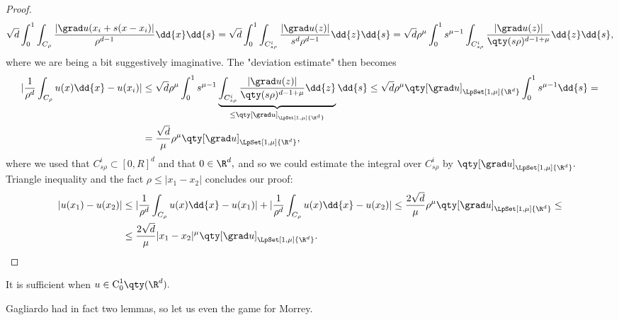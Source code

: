 \begin{proof}
	\[
		\sqrt{d}\int_0^1\int_{C_{\rho}}\frac{|\grad u(x_i + s(x - x_i)|}{\rho^{d-1}}\dd{x} \dd{s} =\sqrt{d} \int_0^1 \int_{C^i_{s \rho}}\frac{|\grad u(z)|}{s^d \rho^{d-1}}\dd{z}\dd{s} =\sqrt{d} \rho^{\mu} \int_0^1 s^{\mu-1} \int_{C_{s \rho}^i}\frac{|\grad u(z)|}{\qty(s \rho)^{d-1 + \mu}}\dd{z}\dd{s},
	\]
	where we are being a bit suggestively imaginative. The "deviation estimate" then becomes
	\begin{align*}
		|\frac{1}{\rho^d}\int_{C_{\rho}}u(x)\dd{x} - u(x_i)| &\leq \sqrt{d}\rho^{\mu}\int_0^1 s^{\mu-1} \underbrace{\int_{C^i_{s \rho}}\frac{|\grad u(z)|}{\qty(s \rho)^{d-1+\mu}}\dd{z}}_{\leq \qty[\grad u]_{\LpSet[1,\mu]{\R^{d}}}}\dd{s} \leq \sqrt{d} \rho^{\mu} \qty[\grad u]_{\LpSet[1,\mu]{\R^{d}}}\int_0^1 s^{\mu-1}\dd{s}= \\
		&= \frac{\sqrt{d}}{\mu}\rho^{\mu}\qty[\grad u]_{\LpSet[1,\mu]{\R^{d}}},
	\end{align*}
where we used that $C_{s \rho}^i \subset [0,R]^{d}$ and that $0 \in \R^{d},$ and so we could estimate the integral over $C_{s \rho}^i$ by $\qty[\grad u]_{\LpSet[1,\mu]{\R^{d}}}.$ Triangle inequality and the fact $\rho \leq |x_1 - x_2|$ concludes our proof:
\begin{align*}
	|u(x_1) - u(x_2)| &\leq |\frac{1}{\rho^d}\int_{C_{\rho}}u(x)\dd{x} - u(x_1)| + |\frac{1}{\rho^d}\int_{C_{\rho}}u(x)\dd{x} - u(x_2)| \leq \frac{2 \sqrt{d}}{\mu}\rho^{\mu} \qty[\grad u]_{\LpSet[1, \mu]{\R^{d}}}\leq \\
			  &\leq \frac{2 \sqrt{d}}{\mu}|x_1 - x_2|^{\mu} \qty[\grad u]_{\LpSet[1,\mu]{\R^{d}}}.
\end{align*}
\end{proof}
\begin{remark}
    It is sufficient when $u \in \text{C}^1_0\qty(\R^{d}).$
\end{remark}

Gagliardo had in fact two lemmas, so let us even the game for Morrey.



